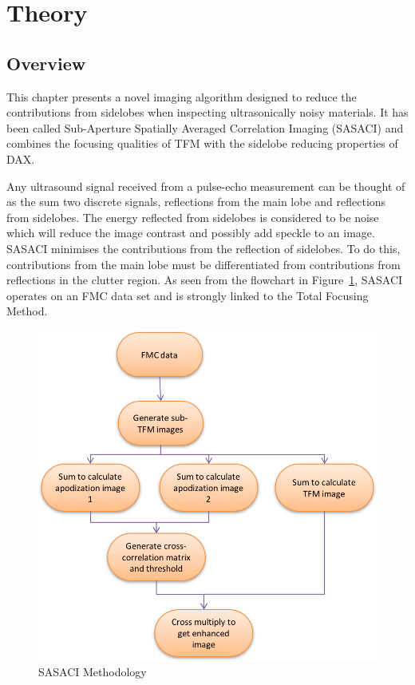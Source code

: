 \section{Theory}
\subsection{Overview}
This chapter presents a novel imaging algorithm designed to reduce the contributions from sidelobes when inspecting ultrasonically noisy materials. It has been called Sub-Aperture Spatially Averaged Correlation Imaging (SASACI) and combines the focusing qualities of TFM with the sidelobe reducing properties of DAX\cite{seo_sidelobe_2008}.

Any ultrasound signal received from a pulse-echo measurement can be thought of as the sum two discrete signals, reflections from the main lobe and reflections from sidelobes. The energy reflected from sidelobes is considered to be noise which will reduce the image contrast and possibly add speckle to an image. SASACI minimises the contributions from the reflection of sidelobes. To do this, contributions from the main lobe must be differentiated from contributions from reflections in the clutter region. As seen from the flowchart in Figure~\ref{fig:sac_flowchart}, SASACI operates on an FMC data set and is strongly linked to the Total Focusing Method.

\begin{figure}[htp]
\centering
		\includegraphics[width=\textwidth]{flowchart.png}
		\caption{SASACI Methodology}
		\label{fig:sac_flowchart}
\end{figure}

